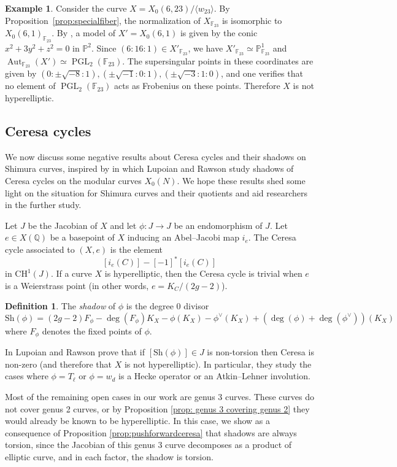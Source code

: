 \documentclass[12pt]{amsart}
\newcommand{\F}{\mathbb{F}}
\renewcommand{\P}{\mathbb{P}}
\newcommand{\Q}{\mathbb{Q}}
\DeclareMathOperator{\Aut}{Aut}
\newcommand{\PGL}{\operatorname{PGL}}
\numberwithin{equation}{subsection}
\theoremstyle{plain}\newtheorem{ithm}{Theorem}
\theoremstyle{plain}\newtheorem{iprop}[ithm]{Proposition}
\theoremstyle{definition}
\newtheorem{definition}[equation]{Definition}
\newtheorem{example}[equation]{Example}
\theoremstyle{remark}
\newcommand{\Curve}[2]{X_0({#1},{#2})} %
\begin{document}
\begin{example}
Consider the curve $X = \Curve{6}{23} / \langle w_{23} \rangle$. By Proposition~\ref{prop:specialfiber}, the normalization of $X_{\F_{23}}$ is isomorphic to $\Curve{6}{1}_{\F_{23}}$. By \cite{BabaGranath}, a model of $X' = \Curve{6}{1}$ is given by the conic $x^2 + 3y^2 + z^2 = 0$ in $\P^2$. Since $(6:16:1) \in X'_{\F_{23}}$, we have $X'_{\F_{23}} \simeq \P^1_{\F_{23}}$ and $\Aut_{\F_{23}}(X') \simeq \PGL_2(\F_{23})$. The supersingular points in these coordinates are given by $(0:\pm \sqrt{-8}:1), (\pm \sqrt{-1} : 0 : 1), (\pm \sqrt{-3} : 1 : 0)$, and one verifies that no element of $\PGL_2(\F_{23})$ acts as Frobenius on these points. Therefore $X$ is not hyperelliptic. 
\end{example}



\subsection{Ceresa cycles}
We now discuss some negative results about Ceresa cycles and their shadows on Shimura curves, inspired by \cite{Ceresa} in which Lupoian and Rawson study shadows of Ceresa cycles on the modular curves $X_0(N)$. We hope these results shed some light on the situation for Shimura curves and their quotients and aid researchers in the further study.

Let $J$ be the Jacobian of $X$ and
let $\phi: J \to J$ be an endomorphism of $J$. Let $e \in X(\Q)$ be a basepoint of $X$ inducing an Abel--Jacobi map $i_e$. The Ceresa cycle associated to $(X,e)$ is the element \[[i_e(C) ] - [-1]^* [i_e(C)]  \] in $\mathrm{CH}^1(J)$.
If a curve $X$ is hyperelliptic, then the Ceresa cycle is trivial when $e$ is a Weierstrass point (in other words, $e = K_C/(2g-2)$).
\begin{definition}
The \emph{shadow} of $\phi$ is the degree 0 divisor
\[ \mathrm{Sh}(\phi) = (2g-2) F_\phi - \deg(F_\phi) K_X - \phi(K_X) - \phi^\vee(K_X) + (\deg(\phi) + \deg(\phi^\vee))(K_X)\]
where $F_\phi$ denotes the fixed points of $\phi$.
\end{definition}

In \cite[Proposition~4]{Ceresa} Lupoian and Rawson prove that if $[\mathrm{Sh}(\phi)] \in J$ is non-torsion then Ceresa is non-zero (and therefore that $X$ is not hyperelliptic).
In particular, they study the cases where $\phi = T_\ell$ or $\phi = w_d$ is a Hecke operator or an Atkin--Lehner involution.

Most of the remaining open cases in our work are genus $3$ curves. 
These curves do not cover genus 2 curves, or by  Proposition \ref{prop: genus 3 covering genus 2} they would already be known to be hyperelliptic. In this case, we show as a consequence of Proposition \ref{prop:pushforwardceresa}  that shadows are always torsion, since the Jacobian of this genus 3 curve decomposes as a product of elliptic curve, and in each factor, the shadow is torsion.
\end{document}
